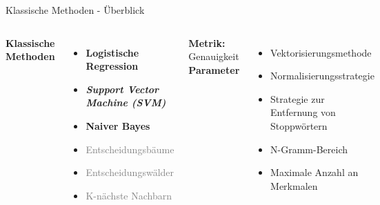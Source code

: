 \documentclass[aspectratio=169]{beamer}
\begin{document}
\begin{frame}{Klassische Methoden - Überblick}
	\fontsize{10pt}{12pt}\selectfont
	\vspace{0.3cm}

	\begin{columns}[t]
		\textbf{Klassische Methoden}
		\vspace{0.3cm}
		\begin{itemize}
			\item \textbf{Logistische Regression}
			\item \textbf{\textit{Support Vector Machine (SVM)}}
			\item \textbf{Naiver Bayes}
			\item \textcolor{gray}{Entscheidungsbäume}
			\item \textcolor{gray}{Entscheidungswälder}
			\item \textcolor{gray}{K-nächste Nachbarn}
		\end{itemize}
		\vspace{0.5cm}
		\textbf{Metrik:} Genauigkeit
		\vspace{-0.5cm}
		\textbf{Parameter}
		\vspace{0.3cm}
		\begin{itemize}
			\item Vektorisierungsmethode
			\item Normalisierungsstrategie
			\item Strategie zur Entfernung von Stoppwörtern
			\item N-Gramm-Bereich
			\item Maximale Anzahl an Merkmalen
		\end{itemize}
	\end{columns}
\end{frame}
\end{document}
